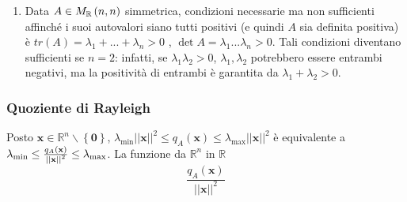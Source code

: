 \documentclass{article}
\begin{document}
\begin{enumerate}
\item Data $A\in M_{%
\mathbb{R}
}\left( n,n\right) $ simmetrica, condizioni necessarie ma non sufficienti
affinch\'{e} i suoi autovalori siano tutti positivi (e quindi $A$ sia
definita positiva) \`{e} $tr\left( A\right) =\lambda _{1}+...+\lambda _{n}>0$%
, $\det A=\lambda _{1}...\lambda _{n}>0$. Tali condizioni diventano
sufficienti se $n=2$: infatti, se $\lambda _{1}\lambda _{2}>0$, $\lambda
_{1},\lambda _{2}$ potrebbero essere entrambi negativi, ma la positivit\`{a}
di entrambi \`{e} garantita da $\lambda _{1}+\lambda _{2}>0$.
\end{enumerate}

\subsubsection{Quoziente di Rayleigh}

Posto $\mathbf{x\in 
\mathbb{R}
}^{n}\backslash \left\{ \mathbf{0}\right\} $, $\lambda _{\min }\left\vert
\left\vert \mathbf{x}\right\vert \right\vert ^{2}\leq q_{A}\left( \mathbf{x}%
\right) \leq \lambda _{\max }\left\vert \left\vert \mathbf{x}\right\vert
\right\vert ^{2}$ \`{e} equivalente a $\lambda _{\min }\leq \frac{%
q_{A}\left( \mathbf{x}\right) }{\left\vert \left\vert \mathbf{x}\right\vert
\right\vert ^{2}}\leq \lambda _{\max }$. La funzione da $%
\mathbb{R}
^{n}$ in $%
\mathbb{R}
$ 
\begin{equation*}
\frac{q_{A}\left( \mathbf{x}\right) }{\left\vert \left\vert \mathbf{x}%
\right\vert \right\vert ^{2}}
\end{equation*}
\end{document}
